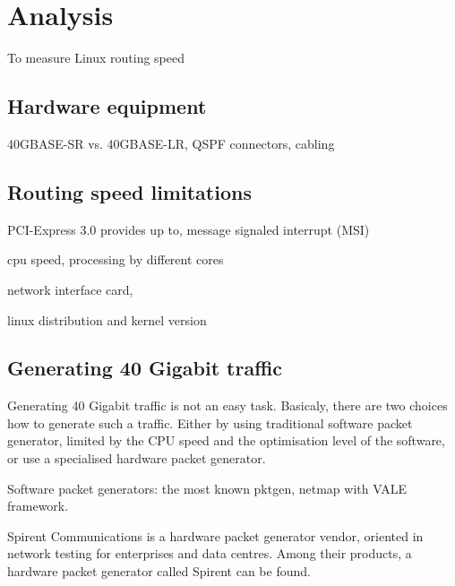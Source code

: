 
\chapter{Analysis}
To measure Linux routing speed %

\section{Hardware equipment}
40GBASE-SR vs. 40GBASE-LR,
QSPF connectors,
cabling


\section{Routing speed limitations}
PCI-Express 3.0 provides up to, %
message signaled interrupt (MSI)

cpu speed,
processing by different cores %

network interface card,

linux distribution and kernel version


\section{Generating 40 Gigabit traffic}
Generating 40 Gigabit traffic is not an easy task.
Basicaly, there are two choices how to generate such a traffic.
Either by using traditional software packet generator,
limited by the CPU speed and the optimisation level of the software,
or use a specialised hardware packet generator.

Software packet generators:
the most known pktgen,
netmap with VALE framework.

Spirent Communications is a hardware packet generator vendor,
oriented in network testing for enterprises and data centres. %
Among their products, a hardware packet generator called Spirent %
can be found.
